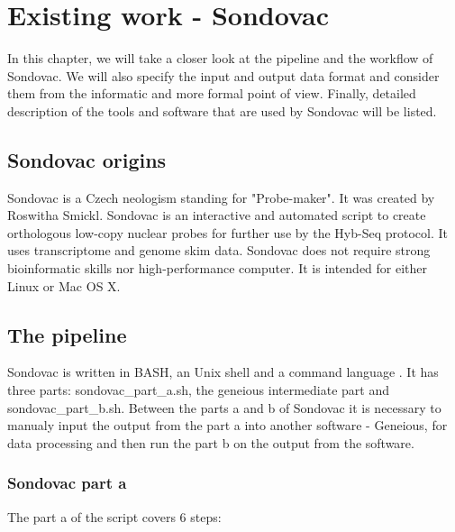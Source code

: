\chapter[Existing work - Sondovac]{Existing work - Sondovac}
\label{kap:existing_work}

In this chapter, we will take a closer look at the pipeline and the workflow of Sondovac. We 
will also specify the input and output data format and consider them from the informatic and 
more formal point of view. Finally, detailed description of the tools and software that are used by 
Sondovac will be listed. 

\section{Sondovac origins}

Sondovac is a Czech neologism standing for "Probe-maker". It was created by Roswitha Smickl. 
Sondovac is an interactive and automated script to create orthologous low-copy nuclear 
probes for further use by the Hyb-Seq protocol. It uses transcriptome and genome skim data. 
Sondovac does not require strong bioinformatic skills nor high-performance computer. It is 
intended for either Linux or Mac OS X. 

\section{The pipeline}

Sondovac is written in BASH, an Unix shell and a command language \cite{bash}. It has three 
parts: sondovac\_part\_a.sh, the geneious \cite{geneious} intermediate part and sondovac\_part\_b.sh. Between 
the parts a and b of Sondovac it is necessary to manualy input the output from the part a into 
another software - Geneious, for data processing and then run the part b on the output from the software. 

\subsection{Sondovac part a}%

The part a of the script covers 6 steps: 

